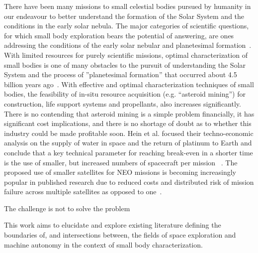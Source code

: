 There have been many missions to small celestial bodies pursued by humanity in our endeavour to better understand the formation of the Solar System and the conditions in the early solar nebula. The major categories of scientific questions, for which small body exploration bears the potential of answering, are ones addressing the conditions of the early solar nebular and planetesimal formation~\cite{Davidsson2021}. With limited resources for purely scientific missions, optimal characterization of small bodies is one of many obstacles to the pursuit of understanding the Solar System and the process of ''planetesimal formation'' that occurred about 4.5 billion years ago~\cite{Klahr2015}. With effective and optimal characterization techniques of small bodies, the feasibility of in-situ resource acquisition (e.g. ``asteroid mining'') for construction, life support systems and propellants, also increases significantly. There is no contending that asteroid mining is a simple problem financially, it has significant cost implications, and there is no shortage of doubt as to whether this industry could be made profitable soon. Hein et al. focused their techno-economic analysis on the supply of water in space and the return of platinum to Earth and conclude that a key technical parameter for reaching break-even in a shorter time is the use of smaller, but increased numbers of spacecraft per mission ~\cite{Hein2020}. The proposed use of smaller satellites for \gls{NEO} missions is becoming increasingly popular in published research due to reduced costs and distributed risk of mission failure across multiple satellites as opposed to one~\cite{Wells2006, Laurin2008, Scott2013, Yu2014}.


The challenge is not to solve the problem


This work aims to elucidate and explore
existing literature defining the boundaries of, and intersections between, the
fields of space exploration and machine autonomy in the context of small body
characterization.




\cite{Rivkin2021}







